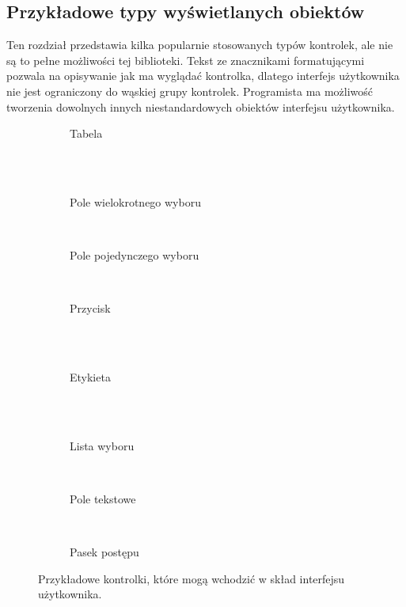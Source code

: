 \subsection{Przykładowe typy wyświetlanych obiektów}
\label{Przykladowe_obiekty}

Ten rozdział przedstawia kilka popularnie stosowanych typów kontrolek, ale nie są to pełne możliwości tej biblioteki. Tekst ze znacznikami formatującymi pozwala na opisywanie jak ma wyglądać kontrolka, dlatego interfejs użytkownika nie jest ograniczony do wąskiej grupy kontrolek. Programista ma możliwość tworzenia dowolnych innych niestandardowych obiektów interfejsu użytkownika.


\begin{figure}[htb]
	\centering
	\begin{subfigure}[b]{9cm}
		\caption{ Tabela \\ ~ }
	\end{subfigure}
	~
	\begin{subfigure}[b]{5cm}
		\caption{ Pole wielokrotnego wyboru }
	\end{subfigure}
	~
	\begin{subfigure}[b]{5cm}
		\caption{  Pole pojedynczego wyboru }
	\end{subfigure}
	~
	\begin{subfigure}[b]{5cm}
		\caption{ Przycisk  \\ ~ }
	\end{subfigure}
	~
	\begin{subfigure}[b]{5cm}
		\caption{ Etykieta \\ ~ }
	\end{subfigure}
	~
	\begin{subfigure}[b]{5cm}
		\caption{ Lista wyboru   }
	\end{subfigure}
	~
	\begin{subfigure}[b]{5cm}
		\caption{ Pole tekstowe }
	\end{subfigure} 
	~
	\begin{subfigure}[b]{5cm}
		\caption{ Pasek postępu }
	\end{subfigure} 
	
	\caption{ Przykładowe kontrolki, które mogą wchodzić w skład interfejsu użytkownika. }
	\label{GUIControlsExamples}
\end{figure}

